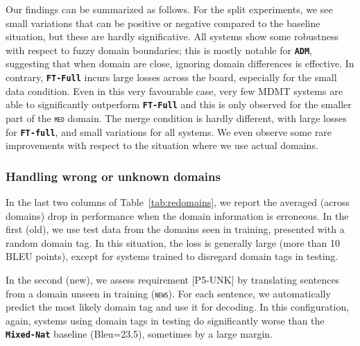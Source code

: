 \documentclass[11pt,a4paper]{article}
\newcommand{\fyDone}[1]{\done[FY]\Todo[FY:]{\textcolor{orange}{#1}}}
\newcommand{\jcTodo}[1]{\Todo[JC:]{\textcolor{red}{#1}}}
\newcommand{\domain}[1]{\texttt{\textsc{#1}}}
\newcommand{\system}[1]{\texttt{\textbf{#1}}}
\begin{document}
Our findings can be summarized as follows. For the split experiments, we see small variations that can be positive or negative compared to the baseline situation, but these are hardly significative. All systems show some robustness with respect to fuzzy domain boundaries; this is mostly notable for \system{ADM}, suggesting that when domain are close, ignoring domain differences is effective. In contrary, \system{FT-Full} incurs large losses across the board, especially for the small data condition. Even in this very favourable case, very few MDMT systems are able to significantly outperform \system{FT-Full} and this is only observed for the smaller part of the \domain{med} domain. The merge condition is hardly different, with large losses for \system{FT-full}, and small variations for all systems. We even observe some rare improvements with respect to the situation where we use actual domains.\fyDone{More comments ?}

\subsubsection{Handling wrong or unknown domains \label{sssec:unknowns}}

\fyDone{Prepare table for the wrong domain analysis (see also last col. of the first table)}In the last two columns of Table~\ref{tab:redomains}, we report the averaged (across domains) drop in performance when the domain information is erroneous. In the first (old), we use test data from the domains seen in training, presented with a random domain tag\jcTodo{all configs use the same tag or is randomization is run for each config}. In this situation, the loss is generally large (more than 10 BLEU points), except for systems trained to disregard domain tags in testing.\fyDone{Comments?}

In the second (new), we assess requirement [P5-UNK] by translating sentences from a domain unseen in training (\domain{news}).\jcTodo{i would use RND / UNK rather than OLD / NEW}
For each sentence, we automatically predict the most likely domain tag and use it for decoding.
In this configuration, again, systems using domain tags in testing do significantly worse than the \system{Mixed-Nat} baseline (Bleu=23.5)\jcTodo{performance drop is now measured against Mixed-nat (leave it clearer?)}, sometimes by a large margin.\fyDone{Check significance, To be completed}
\end{document}
